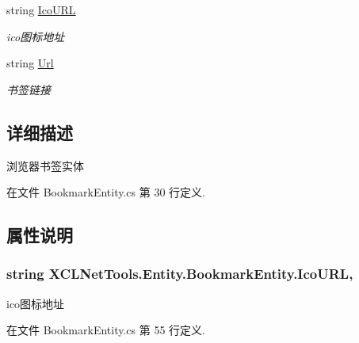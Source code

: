 \begin{DoxyCompactItemize}
string \hyperlink{class_x_c_l_net_tools_1_1_entity_1_1_bookmark_entity_af370dbfd32e8cde501e305c6999c077b}{Ico\-U\-R\-L}
\begin{DoxyCompactList}\small\item\em ico图标地址 \end{DoxyCompactList}\item 
string \hyperlink{class_x_c_l_net_tools_1_1_entity_1_1_bookmark_entity_a88ebfe2441fd5804a82f5eaee1ce3232}{Url}
\begin{DoxyCompactList}\small\item\em 书签链接 \end{DoxyCompactList}\end{DoxyCompactItemize}


\subsection{详细描述}
浏览器书签实体 



在文件 Bookmark\-Entity.\-cs 第 30 行定义.



\subsection{属性说明}
\hypertarget{class_x_c_l_net_tools_1_1_entity_1_1_bookmark_entity_af370dbfd32e8cde501e305c6999c077b}{
\subsubsection[{Ico\-U\-R\-L}]{\setlength{\rightskip}{0pt plus 5cm}string X\-C\-L\-Net\-Tools.\-Entity.\-Bookmark\-Entity.\-Ico\-U\-R\-L\hspace{0.3cm}{\ttfamily [get]}, {\ttfamily [set]}}}\label{class_x_c_l_net_tools_1_1_entity_1_1_bookmark_entity_af370dbfd32e8cde501e305c6999c077b}


ico图标地址 



在文件 Bookmark\-Entity.\-cs 第 55 行定义.

